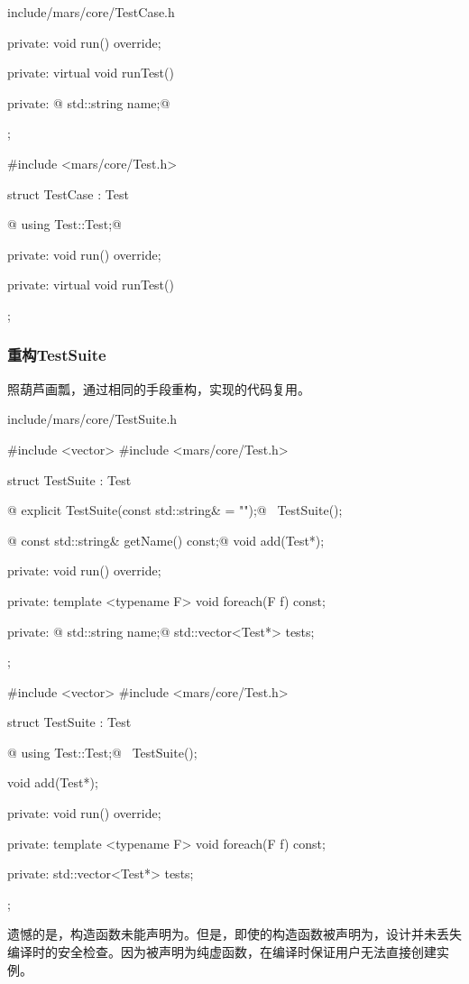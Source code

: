 \begin{content}
\begin{diff}{include/mars/core/TestCase.h}
\begin{minicpp}
{private:
  void run() override;

private:
  virtual void runTest() {}

private:
@  std::string name;@
};
 \end{minicpp}
\tcblower
 \begin{minicpp}
#include <mars/core/Test.h>

struct TestCase : Test {
@  using Test::Test;@

private:
  void run() override;

private:
  virtual void runTest() {}
};
 \end{minicpp}
\end{diff}

\subsubsection{重构TestSuite}

照葫芦画瓢，通过相同的手段重构，实现的代码复用。

\begin{diff}{include/mars/core/TestSuite.h}
 \begin{minicpp}
#include <vector>
#include <mars/core/Test.h>

struct TestSuite : Test {
@  explicit TestSuite(const std::string& = "");@
  ~TestSuite();

@  const std::string& getName() const;@
  void add(Test*);

private:
  void run() override;

private:
  template <typename F>
  void foreach(F f) const;

private:
@  std::string name;@
  std::vector<Test*> tests;
};
 \end{minicpp}
\tcblower
 \begin{minicpp}
#include <vector>
#include <mars/core/Test.h>

struct TestSuite : Test {
@  using Test::Test;@
  ~TestSuite();

  void add(Test*);

private:
  void run() override;

private:
  template <typename F>
  void foreach(F f) const;

private:
  std::vector<Test*> tests;
};
 \end{minicpp}
\end{diff}

遗憾的是，构造函数未能声明为。但是，即使的构造函数被声明为，设计并未丢失编译时的安全检查。因为被声明为纯虚函数，在编译时保证用户无法直接创建实例。


\end{content}
